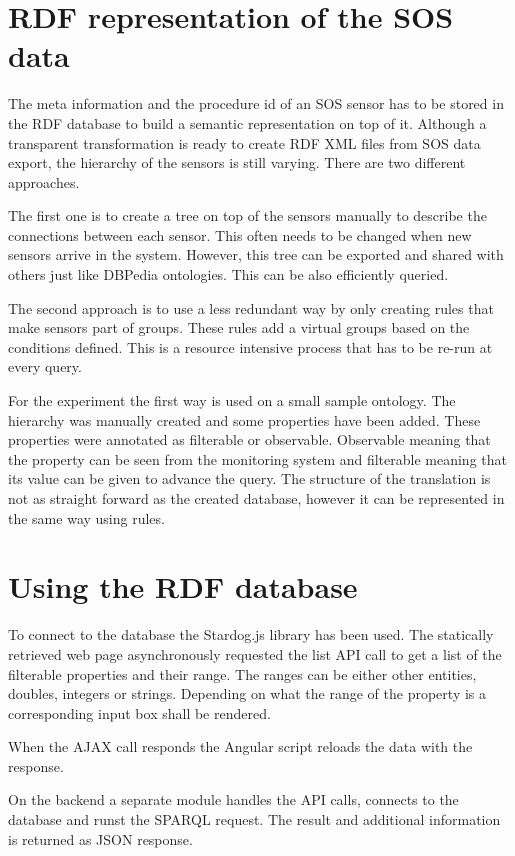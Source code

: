 \section{RDF representation of the SOS data}

The meta information and the procedure id of an SOS sensor has to be stored in the RDF database to build a semantic representation on top of it. Although a transparent transformation is ready to create RDF XML files from SOS data export, the hierarchy of the sensors is still varying. There are two different approaches.

The first one is to create a tree on top of the sensors manually to describe the connections between each sensor. This often needs to be changed when new sensors arrive in the system. However, this tree can be exported and shared with others just like DBPedia ontologies. This can be also efficiently queried.

The second approach is to use a less redundant way by only creating rules that make sensors part of groups. These rules add a virtual groups based on the conditions defined. This is a resource intensive process that has to be re-run at every query. 

For the experiment the first way is used on a small sample ontology. The hierarchy was manually created and some properties have been added. These properties were annotated as filterable or observable. Observable meaning that the property can be seen from the monitoring system and filterable meaning that its value can be given to advance the query. The structure of the translation is not as straight forward as the created database, however it can be represented in the same way using rules. 

\section{Using the RDF database}

To connect to the database the Stardog.js library has been used. The statically retrieved web page asynchronously requested the list API call to get a list of the filterable properties and their range. The ranges can be either other entities, doubles, integers or strings. Depending on what the range of the property is a corresponding input box shall be rendered.

When the AJAX call responds the Angular script reloads the data with the response. 

On the backend a separate module handles the API calls, connects to the database and runst the SPARQL request. The result and additional information is returned as JSON response.

